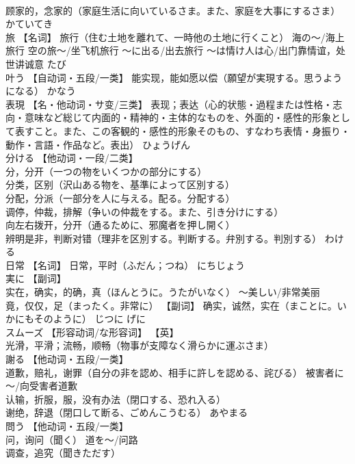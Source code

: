 \documentclass[8pt]{extreport}
\begin{document}
\begin{CJK}{UTF8}{min}
\\	顾家的，念家的（家庭生活に向いているさま。また、家庭を大事にするさま）	かていてき	
\\	旅	【名词】 旅行（住む土地を離れて、一時他の土地に行くこと） 海の～/海上旅行 空の旅～/坐飞机旅行 ～に出る/出去旅行 ～は情け人は心/出门靠情谊，处世讲诚意	たび	
\\	叶う	【自动词・五段/一类】 能实现，能如愿以偿（願望が実現する。思うようになる）	かなう	
\\	表現	【名・他动词・サ变/三类】 表现；表达（心的状態・過程または性格・志向・意味など総じて内面的・精神的・主体的なものを、外面的・感性的形象として表すこと。また、この客観的・感性的形象そのもの、すなわち表情・身振り・動作・言語・作品など。表出）	ひょうげん	
\\	分ける	【他动词・一段/二类】 
\\	分，分开（一つの物をいくつかの部分にする） 
\\	分类，区别（沢山ある物を、基準によって区別する） 
\\	分配，分派（一部分を人に与える。配る。分配する） 
\\	调停，仲裁，排解（争いの仲裁をする。また、引き分けにする） 
\\	向左右拨开，分开（通るために、邪魔者を押し開く） 
\\	辨明是非，判断对错（理非を区別する。判断する。弁別する。判別する）	わける	
\\	日常	【名词】 日常，平时（ふだん；つね）	にちじょう	
\\	実に	【副词】 
\\	实在，确实，的确，真（ほんとうに。うたがいなく） ～美しい/非常美丽 
\\	竟，仅仅，足（まったく。非常に） 【副词】 确实，诚然，实在（まことに。いかにもそのように）	じつに げに	
\\	スムーズ	【形容动词/な形容词】 【英】
\\	光滑，平滑；流畅，顺畅（物事が支障なく滑らかに運ぶさま）		
\\	謝る	【他动词・五段/一类】 
\\	道歉，赔礼，谢罪（自分の非を認め、相手に許しを認める、詫びる） 被害者に～/向受害者道歉 
\\	认输，折服，服，没有办法（閉口する、恐れ入る） 
\\	谢绝，辞退（閉口して断る、ごめんこうむる）	あやまる	
\\	問う	【他动词・五段/一类】 
\\	问，询问（聞く） 道を〜/问路 
\\	调查，追究（聞きただす） 

\end{CJK}
\end{document}
